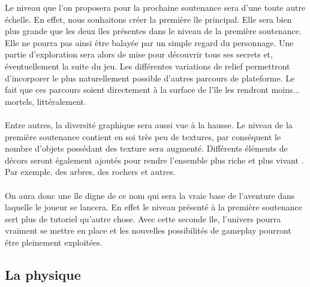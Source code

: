 \documentclass[a4paper]{article}
\begin{document}
Le niveau que l'on proposera pour la prochaine soutenance sera d'une toute autre échelle. En effet, nous souhaitons créer la première île principal. Elle sera bien plus grande que les deux îles présentes dans le niveau de la première soutenance. Elle ne pourra pas ainsi être balayée par un simple regard du personnage. Une partie d'exploration sera alors de mise pour découvrir tous ses secrets et, éventuellement la suite du jeu.
Les différentes variations de relief permettront d'incorporer le plus naturellement possible d'autres parcours de plateforme. Le fait que ces parcours soient directement à la surface de l'île les rendront moins... mortels, littéralement.\\
\\
Entre autres, la diversité graphique sera aussi vue à la hausse. Le niveau de la première soutenance contient en soi très peu de textures, par conséquent le nombre d'objets possédant des texture sera augmenté. Différents éléments de décors seront également ajoutés pour rendre l’ensemble plus riche et plus vivant . Par exemple, des arbres, des rochers et autres.\\
\\
On aura donc une île digne de ce nom qui sera la vraie base de l'aventure dans laquelle le joueur se lancera. En effet le niveau présenté à la première soutenance sert plus de tutoriel qu'autre chose. Avec cette seconde île, l'univers pourra vraiment se mettre en place et les nouvelles possibilités de gameplay pourront être pleinement exploitées. 


\pagebreak

\subsection{La physique}
\vspace{0.5 cm}
\end{document}
